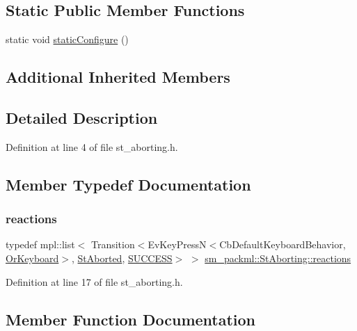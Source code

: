 \subsection*{Static Public Member Functions}
\begin{DoxyCompactItemize}
\item 
static void \hyperlink{structsm__packml_1_1StAborting_a221bf7399be134b4d0fd498327613e70}{static\+Configure} ()
\end{DoxyCompactItemize}
\subsection*{Additional Inherited Members}


\subsection{Detailed Description}


Definition at line 4 of file st\+\_\+aborting.\+h.



\subsection{Member Typedef Documentation}
\mbox{\label{structsm__packml_1_1StAborting_a11d6f3f4d621d1bffb086734bbf70c49}} 
\subsubsection{\texorpdfstring{reactions}{reactions}}
{\footnotesize\ttfamily typedef mpl\+::list$<$ Transition$<$Ev\+Key\+PressN$<$Cb\+Default\+Keyboard\+Behavior, \hyperlink{classsm__packml_1_1OrKeyboard}{Or\+Keyboard}$>$, \hyperlink{structsm__packml_1_1StAborted}{St\+Aborted}, \hyperlink{classSUCCESS}{S\+U\+C\+C\+E\+SS}$>$ $>$ \hyperlink{structsm__packml_1_1StAborting_a11d6f3f4d621d1bffb086734bbf70c49}{sm\+\_\+packml\+::\+St\+Aborting\+::reactions}}



Definition at line 17 of file st\+\_\+aborting.\+h.



\subsection{Member Function Documentation}
\mbox{\label{structsm__packml_1_1StAborting_a6b4c9fc5bec941da54df5802cb0ee60d}} 
